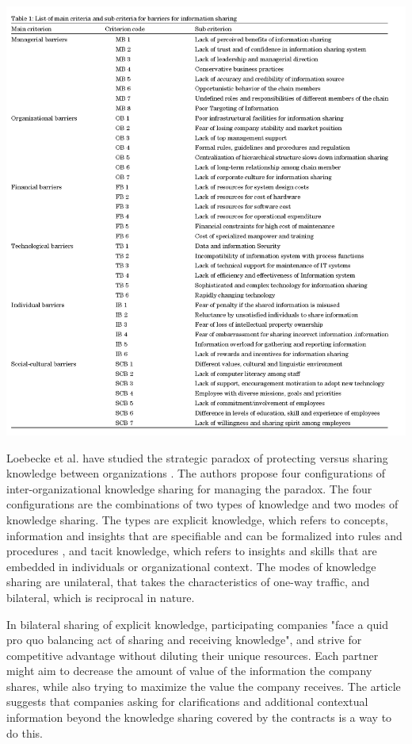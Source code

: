 \includegraphics{images/barriers}

Loebecke et al. have studied the strategic paradox of protecting versus sharing knowledge between organizations \cite{loebbecke2016managing}. The authors propose four configurations of inter-organizational knowledge sharing for managing the paradox. The four configurations are the combinations of two types of knowledge and two modes of knowledge sharing. The types are explicit knowledge, which refers to concepts, information and insights that are specifiable and can be formalized into rules and procedures \cite{walsh1987formalization}, and tacit knowledge, which refers to insights and skills that are embedded in individuals or organizational context. The modes of knowledge sharing are unilateral, that takes the characteristics of one-way traffic, and bilateral, which is reciprocal in nature. 

In bilateral sharing of explicit knowledge, participating companies "face a quid pro quo balancing act of sharing and receiving knowledge", and strive for competitive advantage without diluting their unique resources. Each partner might aim to decrease the amount of value of the information the company shares, while also trying to maximize the value the company receives. The article suggests that companies asking for clarifications and additional contextual information beyond the knowledge sharing covered by the contracts is a way to do this.


